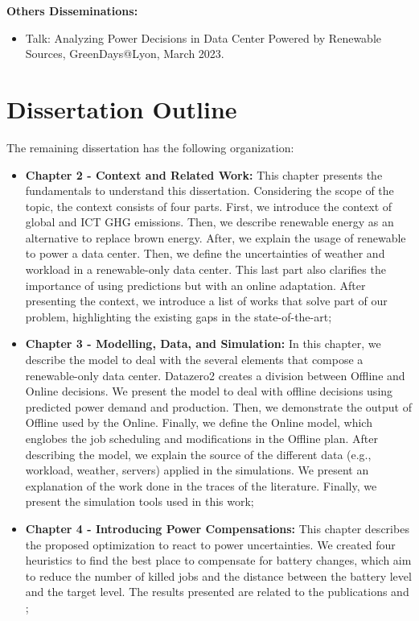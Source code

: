 \textbf{Others Disseminations:}
\begin{itemize}
    \item Talk: Analyzing Power Decisions in Data Center
    Powered by Renewable Sources, GreenDays@Lyon, March 2023.
\end{itemize}

\section{Dissertation Outline}
The remaining dissertation has the following organization:
\begin{itemize}
    \item[] \textbf{Chapter 2 - Context and Related Work:} This chapter presents the fundamentals to understand this dissertation. Considering the scope of the topic, the context consists of four parts. First, we introduce the context of global and ICT GHG emissions. Then, we describe renewable energy as an alternative to replace brown energy. After, we explain the usage of renewable to power a data center. Then, we define the uncertainties of weather and workload in a renewable-only data center. This last part also clarifies the importance of using predictions but with an online adaptation. After presenting the context, we introduce a list of works that solve part of our problem, highlighting the existing gaps in the state-of-the-art;
    \item[] \textbf{Chapter 3 - Modelling, Data, and Simulation:} In this chapter, we describe the model to deal with the several elements that compose a renewable-only data center. Datazero2 creates a division between Offline and Online decisions. We present the model to deal with offline decisions using predicted power demand and production. Then, we demonstrate the output of Offline used by the Online. Finally, we define the Online model, which englobes the job scheduling and modifications in the Offline plan. After describing the model, we explain the source of the different data (e.g., workload, weather, servers) applied in the simulations. We present an explanation of the work done in the traces of the literature. Finally, we present the simulation tools used in this work;
    \item[] \textbf{Chapter 4 - Introducing Power Compensations:} This chapter describes the proposed optimization to react to power uncertainties. We created four heuristics to find the best place to compensate for battery changes, which aim to reduce the number of killed jobs and the distance between the battery level and the target level. The results presented are related to the publications \cite{de2022mixing} and \cite{de2022analyzing};

\end{itemize}

